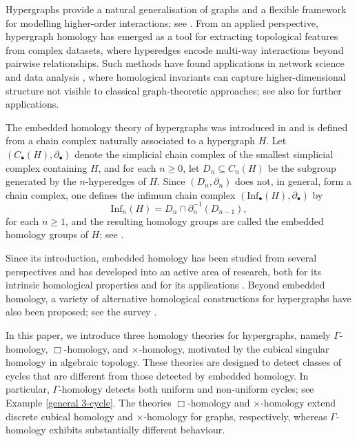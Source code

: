 \documentclass[10pt,a4paper]{amsart}
\begin{document}
Hypergraphs provide a natural generalisation of graphs and a flexible framework for modelling higher-order interactions; see \cite{HG_Emilie,HG_Bretto}. From an applied perspective, hypergraph homology has emerged as a tool for extracting topological features from complex datasets, where hyperedges encode multi-way interactions beyond pairwise relationships. Such methods have found applications in network science and data analysis \cite{HG_Emilie,HG_Bressan}, where homological invariants can capture higher-dimensional \linebreak structure not visible to classical graph-theoretic approaches; see also \cite{HG_bretto13,HG_Gaspar26,HG_Liu24} for further applications.

The embedded homology theory of hypergraphs was introduced in \linebreak \cite{HG_Bressan} and is defined from a chain complex naturally associated to a hypergraph $H$. Let $(C_\bullet(H),\partial_\bullet)$ denote the simplicial chain complex of the smallest simplicial complex containing $H$, and for each $n\geq 0$, let $D_n\subseteq C_n(H)$ be the subgroup generated by the $n$-hyperedges of $H$. Since $(D_n,\partial_n)$ does not, in general, form a chain complex, one defines the infimum chain complex $(\mathrm{Inf}_\bullet(H),\partial_\bullet)$ by
\[
\mathrm{Inf}_n(H)=D_n\cap \partial_n^{-1}(D_{n-1}),
\]
for each $n\geq 1$, and the resulting homology groups are called the embedded homology groups of $H$; see \cite{HG_Bressan}.

Since its introduction, embedded homology has been studied from several perspectives and has developed into an active area of research, both for its intrinsic homological properties and for its applications \cite{HG_Gaspar26,HG_Liu24,HG_Ren26,HG_Valentiner26}. Beyond embedded homology, a variety of alternative homological constructions for hypergraphs have also been proposed; see the survey \cite{HG_Gaspar26}.

In this paper, we introduce three homology theories for hypergraphs, namely $\Gamma$-homology, $\Box$-homology, and $\times$-homology, motivated by the cubical singular homology in algebraic topology. These theories are designed to detect classes of cycles that are different from those detected by embedded homology. In particular, $\Gamma$-homology detects both uniform and non-uniform cycles; see Example \ref{general 3-cycle}. The theories $\Box$-homology and $\times$-homology extend discrete cubical homology and $\times$-homology for graphs, respectively, whereas $\Gamma$-homology exhibits substantially different behaviour.
\end{document}
